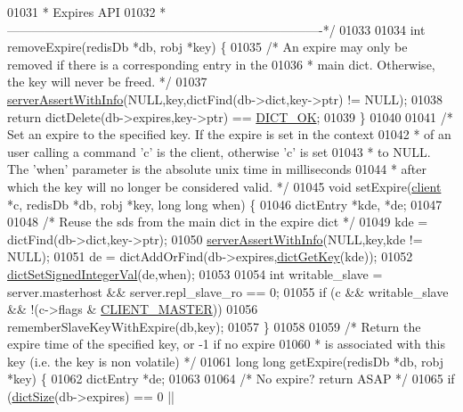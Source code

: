 \begin{DoxyCode}
01031 \textcolor{comment}{ * Expires API}
01032 \textcolor{comment}{ *----------------------------------------------------------------------------*/}
01033 
01034 \textcolor{keywordtype}{int} removeExpire(redisDb *db, robj *key) \{
01035     \textcolor{comment}{/* An expire may only be removed if there is a corresponding entry in the}
01036 \textcolor{comment}{     * main dict. Otherwise, the key will never be freed. */}
01037     \hyperlink{server_8h_a7308f76cbff9a8d3797fe78190b91282}{serverAssertWithInfo}(NULL,key,dictFind(db->dict,key->ptr) != NULL);
01038     \textcolor{keywordflow}{return} dictDelete(db->expires,key->ptr) == \hyperlink{dict_8h_a2afecbeab8f7efbc183048f52f6d17e5}{DICT\_OK};
01039 \}
01040 
01041 \textcolor{comment}{/* Set an expire to the specified key. If the expire is set in the context}
01042 \textcolor{comment}{ * of an user calling a command 'c' is the client, otherwise 'c' is set}
01043 \textcolor{comment}{ * to NULL. The 'when' parameter is the absolute unix time in milliseconds}
01044 \textcolor{comment}{ * after which the key will no longer be considered valid. */}
01045 \textcolor{keywordtype}{void} setExpire(\hyperlink{structclient}{client} *c, redisDb *db, robj *key, \textcolor{keywordtype}{long} \textcolor{keywordtype}{long} when) \{
01046     dictEntry *kde, *de;
01047 
01048     \textcolor{comment}{/* Reuse the sds from the main dict in the expire dict */}
01049     kde = dictFind(db->dict,key->ptr);
01050     \hyperlink{server_8h_a7308f76cbff9a8d3797fe78190b91282}{serverAssertWithInfo}(NULL,key,kde != NULL);
01051     de = dictAddOrFind(db->expires,\hyperlink{dict_8h_a3271c334309904a3086deca94f96e46e}{dictGetKey}(kde));
01052     \hyperlink{dict_8h_a712bcfafed90e7d5ffeba5f6bf027a2c}{dictSetSignedIntegerVal}(de,when);
01053 
01054     \textcolor{keywordtype}{int} writable\_slave = server.masterhost && server.repl\_slave\_ro == 0;
01055     \textcolor{keywordflow}{if} (c && writable\_slave && !(c->flags & \hyperlink{server_8h_a3d8f0cc8d0653ee2b6dafb454292c069}{CLIENT\_MASTER}))
01056         rememberSlaveKeyWithExpire(db,key);
01057 \}
01058 
01059 \textcolor{comment}{/* Return the expire time of the specified key, or -1 if no expire}
01060 \textcolor{comment}{ * is associated with this key (i.e. the key is non volatile) */}
01061 \textcolor{keywordtype}{long} \textcolor{keywordtype}{long} getExpire(redisDb *db, robj *key) \{
01062     dictEntry *de;
01063 
01064     \textcolor{comment}{/* No expire? return ASAP */}
01065     \textcolor{keywordflow}{if} (\hyperlink{dict_8h_af193430dd3d5579a52b194512f72c1f0}{dictSize}(db->expires) == 0 ||

\end{DoxyCode}
